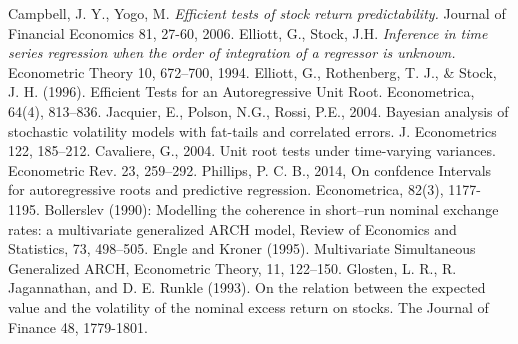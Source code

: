 \documentclass{article}
\begin{document}
\begin{thebibliography}{}

\bibitem{} 
{Campbell, J. Y., Yogo, M. }
\textit{Efficient tests of stock return predictability.} Journal of Financial Economics 81, 27-60, 2006.
\bibitem{} 
{Elliott, G., Stock, J.H.} \textit{Inference in time series regression when the order of integration of a regressor is
unknown.} Econometric Theory 10, 672–700,  1994.
\bibitem{} 
Elliott, G., Rothenberg, T. J., \& Stock, J. H. (1996). Efficient Tests for an Autoregressive Unit Root. Econometrica, 64(4), 813–836.
\bibitem{} 
Jacquier, E., Polson, N.G., Rossi, P.E., 2004. Bayesian analysis of stochastic volatility
models with fat-tails and correlated errors. J. Econometrics 122, 185–212.
\bibitem{} 
Cavaliere, G., 2004. Unit root tests under time-varying variances. Econometric Rev.
23, 259–292.
\bibitem{} 
Phillips, P. C. B., 2014, On confdence Intervals for autoregressive roots and predictive regression. Econometrica, 82(3), 1177-1195.
\bibitem{} 
Bollerslev (1990): Modelling the coherence in short–run nominal exchange rates: a multivariate generalized ARCH model, Review of Economics and Statistics, 73, 498–505.
\bibitem{} 
Engle and Kroner (1995). Multivariate Simultaneous Generalized ARCH, Econometric Theory, 11, 122–150.
\bibitem{} 
Glosten, L. R., R. Jagannathan, and D. E. Runkle (1993). On the relation between the expected value and the volatility of the nominal excess return on stocks. The Journal of Finance 48, 1779-1801.
\end{thebibliography}
\end{document}
